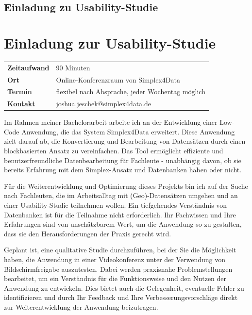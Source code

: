 \ifdefined\STANDALONE
  \section*{Einladung zu Usability-Studie}
\else
  \chapter{Einladung zur Usability-Studie}
  \label{app:invitation}
\fi

\begin{tabular}{ l l }
  \textbf{Zeitaufwand} & 90 Minuten                                                                   \\
  \textbf{Ort}         & Online-Konferenzraum von Simplex4Data                                        \\
  \textbf{Termin}      & flexibel nach Absprache, jeder Wochentag möglich                             \\
  \textbf{Kontakt}     & \href{mailto:joshua.jeschek@simplex4data.de}{joshua.jeschek@simplex4data.de}
\end{tabular}

\vspace{2\baselineskip}

\noindent
Im Rahmen meiner Bachelorarbeit arbeite ich an der Entwicklung einer Low-Code Anwendung, die das
System Simplex4Data erweitert. Diese Anwendung zielt darauf ab, die Konvertierung und Bearbeitung
von Datensätzen durch einen blockbasierten Ansatz zu vereinfachen. Das Tool ermöglicht effiziente
und benutzerfreundliche Datenbearbeitung für Fachleute - unabhängig davon, ob sie bereits Erfahrung
mit dem Simplex-Ansatz und Datenbanken haben oder nicht.

Für die Weiterentwicklung und Optimierung dieses Projekts bin ich auf der Suche nach Fachleuten, die
im Arbeitsalltag mit (Geo)-Datensätzen umgehen und an einer Usability-Studie teilnehmen wollen. Ein
tiefgehendes Verständnis von Datenbanken ist für die Teilnahme nicht erforderlich. Ihr Fachwissen
und Ihre Erfahrungen sind von unschätzbarem Wert, um die Anwendung so zu gestalten, dass sie den
Herausforderungen der Praxis gerecht wird.

Geplant ist, eine qualitative Studie durchzuführen, bei der Sie die Möglichkeit haben, die Anwendung
in einer Videokonferenz unter der Verwendung von Bildschirmfreigabe auszutesten. Dabei werden
praxisnahe Problemstellungen bearbeitet, um ein Verständnis für die Funktionsweise und den Nutzen
der Anwendung zu entwickeln. Dies bietet auch die Gelegenheit, eventuelle Fehler zu identifizieren
und durch Ihr Feedback und Ihre Verbesserungsvorschläge direkt zur Weiterentwicklung der Anwendung
beizutragen.

